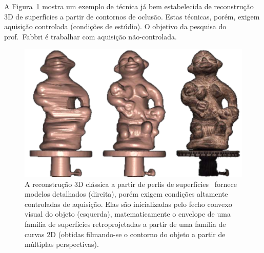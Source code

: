 \documentclass[a4paper,titlepage]{article}
\begin{document}
A Figura~\ref{fig:multiview:stereo} mostra um exemplo de técnica já bem
estabelecida de reconstrução 3D de superfícies a partir de contornos de oclusão.
Estas técnicas, porém, exigem aquisição controlada (condições de estúdio).
O objetivo da pesquisa do prof.\ Fabbri é trabalhar com aquisição não-controlada.
\begin{figure}
\begin{center}
  \includegraphics[width=0.5\linewidth]{figs/multiview-stereo-white.png}
\end{center}
   \caption{
A reconstrução 3D clássica a partir de perfis de superfícies~\cite{Hernandez:Schmitt:CVIU04}
fornece modelos detalhados (direita), porém exigem condições altamente
controladas de aquisição. Elas são inicializadas pelo fecho convexo visual do
objeto (esquerda), matematicamente o envelope de uma família de superfícies retroprojetadas a
partir de uma família de curvas 2D (obtidas filmando-se o contorno do objeto a
partir de múltiplas perspectivas).
}
\label{fig:multiview:stereo}
\end{figure}


\end{document}
